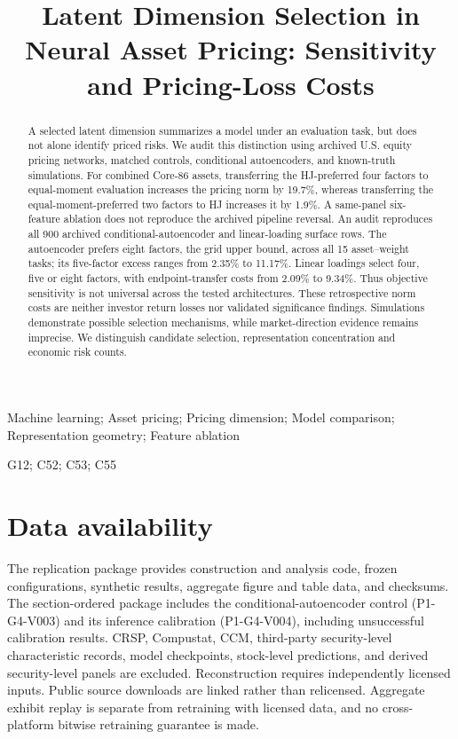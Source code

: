 \documentclass{rQUF2e}
\begin{document}
\title{Latent Dimension Selection in Neural Asset Pricing: Sensitivity and Pricing-Loss Costs}

\maketitle
\begin{abstract}
A selected latent dimension summarizes a model under an evaluation task, but does not alone identify priced risks. We audit this distinction using archived U.S. equity pricing networks, matched controls, conditional autoencoders, and known-truth simulations. For combined Core-86 assets, transferring the HJ-preferred four factors to equal-moment evaluation increases the pricing norm by 19.7\%, whereas transferring the equal-moment-preferred two factors to HJ increases it by 1.9\%. A same-panel six-feature ablation does not reproduce the archived pipeline reversal. An audit reproduces all 900 archived conditional-autoencoder and linear-loading surface rows. The autoencoder prefers eight factors, the grid upper bound, across all 15 asset--weight tasks; its five-factor excess ranges from 2.35\% to 11.17\%. Linear loadings select four, five or eight factors, with endpoint-transfer costs from 2.09\% to 9.34\%. Thus objective sensitivity is not universal across the tested architectures. These retrospective norm costs are neither investor return losses nor validated significance findings. Simulations demonstrate possible selection mechanisms, while market-direction evidence remains imprecise. We distinguish candidate selection, representation concentration and economic risk counts.
\end{abstract}
\begin{keywords}
Machine learning; Asset pricing; Pricing dimension; Model comparison; Representation geometry; Feature ablation
\end{keywords}
\begin{classcode}G12; C52; C53; C55\end{classcode}
\raggedbottom









\section*{Data availability}
The replication package provides construction and analysis code, frozen configurations, synthetic results, aggregate figure and table data, and checksums. The section-ordered package includes the conditional-autoencoder control (P1-G4-V003) and its inference calibration (P1-G4-V004), including unsuccessful calibration results. CRSP, Compustat, CCM, third-party security-level characteristic records, model checkpoints, stock-level predictions, and derived security-level panels are excluded. Reconstruction requires independently licensed inputs. Public source downloads are linked rather than relicensed. Aggregate exhibit replay is separate from retraining with licensed data, and no cross-platform bitwise retraining guarantee is made.
\end{document}
